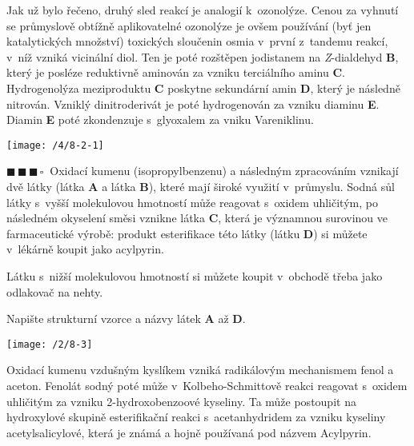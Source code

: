 \documentclass{book}
\newcommand{\tri}{$\blacksquare \, \blacksquare \, \blacksquare \, \square \; \; $}
\renewenvironment{quotation}{\par}{\par} %
\begin{document}
Jak už bylo řečeno, druhý sled reakcí je analogií k~ozonolýze. Cenou
za vyhnutí se průmyslově obtížně aplikovatelné ozonolýze je ovšem
používání (byť jen katalytických množství) toxických sloučenin osmia
v~první z~tandemu reakcí, v~níž vzniká vicinální diol. Ten je poté
rozštěpen jodistanem na \textit{Z}-dialdehyd \textbf{B}, který je posléze reduktivně
aminován za vzniku terciálního aminu \textbf{C}. Hydrogenolýza meziproduktu
\textbf{C} poskytne sekundární amin \textbf{D}, který je následně nitrován. Vzniklý
dinitroderivát je poté hydrogenován za vzniku diaminu \textbf{E}. Diamin \textbf{E}
poté zkondenzuje s~glyoxalem za vniku Vareniklinu.
\noindent \begin{center}

\texttt{[image: /4/8-2-1]}

\par\end{center}

\newpage %
\begin{quotation}
\tri Oxidací kumenu (isopropylbenzenu) a následným zpracováním vznikají
dvě látky (látka \textbf{A} a látka \textbf{B}), které mají široké využití v~průmyslu.
Sodná sůl látky s~vyšší molekulovou hmotností může reagovat s~oxidem
uhličitým, po následném okyselení směsi vznikne látka \textbf{C}, která je
významnou surovinou ve farmaceutické výrobě: produkt esterifikace
této látky (látku \textbf{D}) si můžete v~lékárně koupit jako acylpyrin.

 Látku s~nižší molekulovou hmotností si můžete koupit v~obchodě třeba jako odlakovač na nehty.

 Napište strukturní vzorce a názvy látek \textbf{A} až \textbf{D}.
\end{quotation} \dotfill \par 
\begin{center}
\texttt{[image: /2/8-3]}
\end{center}

Oxidací kumenu vzdušným kyslíkem vzniká radikálovým mechanismem fenol
a aceton. Fenolát sodný poté může v~Kolbeho-Schmittově reakci
reagovat s~oxidem uhličitým za vzniku 2-hydroxobenzoové kyseliny.
Ta může postoupit na hydroxylové skupině esterifikační reakci s~acetanhydridem
za vzniku kyseliny acetylsalicylové, která je známá a hojně používaná
pod názvem Acylpyrin.
\end{document}
